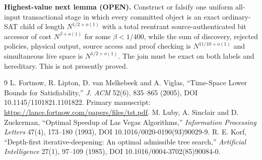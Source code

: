 \documentclass[11pt]{article}
\begin{document}
\noindent\textbf{Highest-value next lemma (OPEN).}
Construct or falsify one uniform all-input transactional stage in which every
committed object is an exact ordinary-SAT child of length
$N^{1/2+o(1)}$ with a total reentrant source-authenticated bit accessor of cost
$N^{\beta+o(1)}$ for some $\beta<1/400$, while the sum of discovery, rejected
policies, physical output, source access and proof checking is
$N^{11/10+o(1)}$ and simultaneous live space is $N^{1/2+o(1)}$.  The join must
be exact on both labels and hereditary.  This is not presently proved.

\begin{thebibliography}{9}
L. Fortnow, R. Lipton, D. van Melkebeek and A. Viglas,
``Time-Space Lower Bounds for Satisfiability,''
\emph{J. ACM} 52(6), 835--865 (2005), DOI 10.1145/1101821.1101822.
Primary manuscript: \url{https://lance.fortnow.com/papers/files/tst.pdf}.
M. Luby, A. Sinclair and D. Zuckerman,
``Optimal Speedup of Las Vegas Algorithms,''
\emph{Information Processing Letters} 47(4), 173--180 (1993),
DOI 10.1016/0020-0190(93)90029-9.
R. E. Korf, ``Depth-first iterative-deepening: An optimal admissible tree
search,'' \emph{Artificial Intelligence} 27(1), 97--109 (1985),
DOI 10.1016/0004-3702(85)90084-0.
\end{thebibliography}
\end{document}
